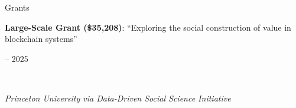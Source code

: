 \documentclass{cv} %
\begin{document}
\begin{cvSection}{Grants}
\begin{minipage}[t]{0.80\linewidth}
    \raggedright \textbf{Large-Scale Grant (\$35,208)}: ``Exploring the social construction of value in blockchain systems''%
\end{minipage}
\hfill
\begin{minipage}[t]{0.15\linewidth}
     -- 2025%
\end{minipage}
\\
\begin{minipage}[t]{0.80\linewidth}
    \raggedright \textit{Princeton University via Data-Driven Social Science Initiative}%
\end{minipage}
\hfill
\begin{minipage}[t]{0.15\linewidth}
\end{minipage}

\end{cvSection}

\end{document}
